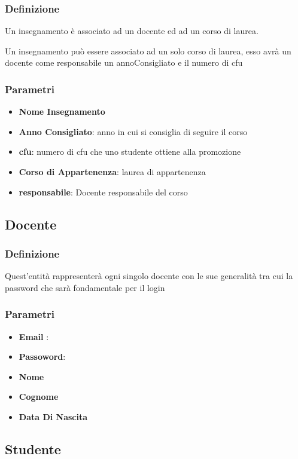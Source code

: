 \subsubsection{Definizione}
Un insegnamento è associato ad un docente ed ad un corso di laurea.

Un insegnamento può essere associato ad un solo corso di laurea, esso avrà un docente come responsabile un annoConsigliato e il numero di cfu
\subsubsection{Parametri}
\begin{itemize}
    \item \textbf{Nome Insegnamento}
    \item \textbf{Anno Consigliato}: anno in cui si consiglia di seguire il corso 
    \item \textbf{cfu}: numero di cfu che uno studente ottiene alla promozione
    \item \textbf{Corso di Appartenenza}: laurea di appartenenza
    \item \textbf{responsabile}: Docente responsabile del corso
    
\end{itemize}
\subsection{Docente} \label{Docente}
\subsubsection{Definizione}
Quest'entità rappresenterà ogni singolo docente con le sue generalità tra cui la password che sarà fondamentale per il login
\subsubsection{Parametri}
\begin{itemize}
    \item \textbf{Email} :
    \item \textbf{Passoword}: 
    \item \textbf{Nome} 
    \item \textbf{Cognome}
    \item \textbf{Data Di Nascita}
\end{itemize}
\subsection{Studente} \label{Studente}


